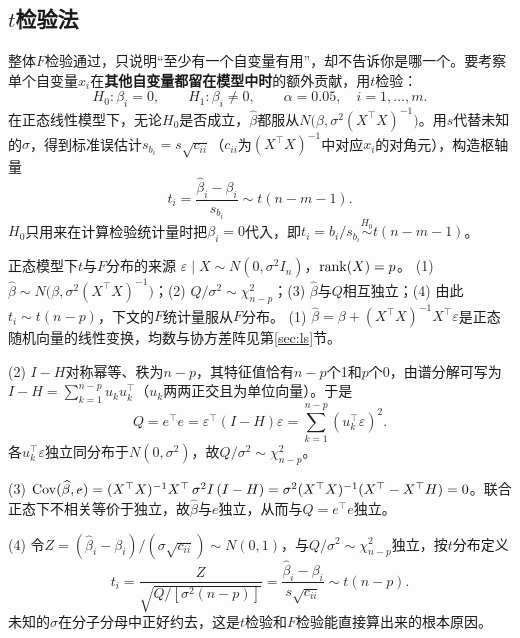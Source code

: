 \subsection{$t$检验法}
整体$F$检验通过，只说明“至少有一个自变量有用”，却不告诉你是哪一个。要考察单个自变量$x_i$在\textbf{其他自变量都留在模型中时}的额外贡献，用$t$检验：
\[
H_0:\beta_i=0,\qquad H_1:\beta_i\ne0,\qquad \alpha=0.05,\quad i=1,\ldots,m.
\]
在正态线性模型下，无论$H_0$是否成立，$\widehat\beta$都服从$N\bigl(\beta,\sigma^2(X^\top X)^{-1}\bigr)$。用$s$代替未知的$\sigma$，得到标准误估计$s_{b_i}=s\sqrt{c_{ii}}$（$c_{ii}$为$(X^\top X)^{-1}$中对应$x_i$的对角元），构造枢轴量
\[
t_i=\frac{\widehat\beta_i-\beta_i}{s_{b_i}}\sim t(n-m-1).
\]
$H_0$只用来在计算检验统计量时把$\beta_i=0$代入，即$t_i=b_i/s_{b_i}\overset{H_0}{\sim}t(n-m-1)$。

\begin{derivation}{正态模型下$t$与$F$分布的来源}
$\varepsilon\mid X\sim N(0,\sigma^2I_n)$，$\operatorname{rank}(X)=p$。
(1) $\widehat\beta\sim N\bigl(\beta,\sigma^2(X^\top X)^{-1}\bigr)$；(2) $Q/\sigma^2\sim\chi^2_{n-p}$；(3) $\widehat\beta$与$Q$相互独立；(4) 由此$t_i\sim t(n-p)$，下文的$F$统计量服从$F$分布。
(1) $\widehat\beta=\beta+(X^\top X)^{-1}X^\top\varepsilon$是正态随机向量的线性变换，均数与协方差阵见第\ref{sec:ls}节。

(2) $I-H$对称幂等、秩为$n-p$，其特征值恰有$n-p$个1和$p$个0，由谱分解可写为$I-H=\sum_{k=1}^{n-p}u_ku_k^\top$（$u_k$两两正交且为单位向量）。于是
\[
Q=e^\top e=\varepsilon^\top(I-H)\varepsilon=\sum_{k=1}^{n-p}(u_k^\top\varepsilon)^2.
\]
各$u_k^\top\varepsilon$独立同分布于$N(0,\sigma^2)$，故$Q/\sigma^2\sim\chi^2_{n-p}$。

(3) $\operatorname{Cov}(\widehat\beta,e)=(X^\top X)^{-1}X^\top\,\sigma^2I\,(I-H)=\sigma^2(X^\top X)^{-1}(X^\top-X^\top H)=0$。联合正态下不相关等价于独立，故$\widehat\beta$与$e$独立，从而与$Q=e^\top e$独立。

(4) 令$Z=(\widehat\beta_i-\beta_i)/(\sigma\sqrt{c_{ii}})\sim N(0,1)$，与$Q/\sigma^2\sim\chi^2_{n-p}$独立，按$t$分布定义
\[
t_i=\frac{Z}{\sqrt{Q/[\sigma^2(n-p)]}}=\frac{\widehat\beta_i-\beta_i}{s\sqrt{c_{ii}}}\sim t(n-p).
\]
未知的$\sigma$在分子分母中正好约去，这是$t$检验和$F$检验能直接算出来的根本原因。
\end{derivation}

